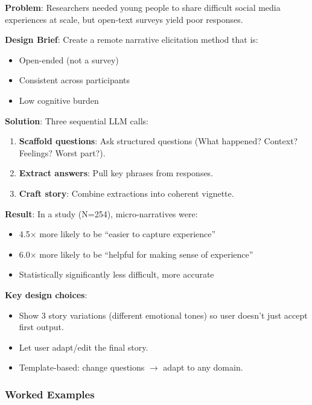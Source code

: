\begin{exbox}
\textbf{Problem}: Researchers needed young people to share difficult social media experiences at scale, but open-text surveys yield poor responses.

\textbf{Design Brief}: Create a remote narrative elicitation method that is:
\begin{itemize}
  \item Open-ended (not a survey)
  \item Consistent across participants
  \item Low cognitive burden
\end{itemize}

\textbf{Solution}: Three sequential LLM calls:
\begin{enumerate}
  \item \textbf{Scaffold questions}: Ask structured questions (What happened? Context? Feelings? Worst part?).
  \item \textbf{Extract answers}: Pull key phrases from responses.
  \item \textbf{Craft story}: Combine extractions into coherent vignette.
\end{enumerate}

\textbf{Result}: In a study (N=254), micro-narratives were:
\begin{itemize}
  \item 4.5$\times$ more likely to be ``easier to capture experience''
  \item 6.0$\times$ more likely to be ``helpful for making sense of experience''
  \item Statistically significantly less difficult, more accurate
\end{itemize}

\textbf{Key design choices}:
\begin{itemize}
  \item Show 3 story variations (different emotional tones) so user doesn't just accept first output.
  \item Let user adapt/edit the final story.
  \item Template-based: change questions $\to$ adapt to any domain.
\end{itemize}
\end{exbox}

\subsubsection*{Worked Examples}

